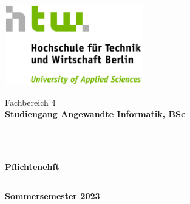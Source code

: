 \documentclass[paper=a4,fontsize=11pt,DIV14]{scrartcl}%
\numberwithin{equation}{section}
\begin{document}


\begin{titlepage}
\thispagestyle{empty}
\begin{center}
\includegraphics[width=0.45\textwidth]{HTW_Logo_rgb}\\
\end{center}
 
 
\begin{center}
\Large{Fachbereich 4}\\
\textbf{Studiengang Angewandte Informatik, BSc}
\end{center}
\begin{verbatim}
 
 
\end{verbatim}
\begin{center}
\textbf{\LARGE{Pflichtenehft}}\\
\end{center}
\begin{verbatim}

\end{verbatim}
\begin{center}
\textbf{\Large{Sommersemester 2023}}\\
\end{center}


\end{titlepage}
\end{document}
